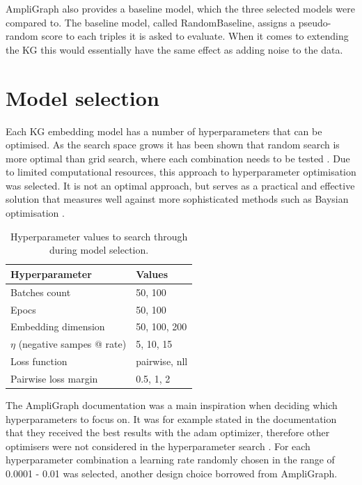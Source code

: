 AmpliGraph also provides a baseline model, which the three selected models were compared to. The baseline model, called RandomBaseline, assigns a pseudo-random score to each triples it is asked to evaluate. When it comes to extending the KG this would essentially have the same effect as adding noise to the data.

\section{Model selection}
Each KG embedding model has a number of hyperparameters that can be optimised. As the search space grows it has been shown that random search is more optimal than grid search, where each combination needs to be tested \cite{bergstra2012random}. Due to limited computational resources, this approach to hyperparameter optimisation was selected. It is not an optimal approach, but serves as a practical and effective solution that measures well against more sophisticated methods such as Baysian optimisation \cite{li2017hyperband}.

\begin{table}[htbp]
\centering
\begin{tabular}{|l|l|}
\hline
\textbf{Hyperparameter}      & \textbf{Values}             \\ \hline
Batches count       & 50, 100                              \\ \hline
Epocs               & 50, 100                          \\ \hline
Embedding dimension                   & 50, 100, 200                     \\ \hline
$\eta$ (negative sampes @ rate)     & 5, 10, 15                            \\ \hline
Loss function   & pairwise, nll                         \\ \hline
Pairwise loss margin    & 0.5, 1, 2                    \\ \hline
\end{tabular}
\caption[Hyperparameter values for model selection.]{Hyperparameter values to search through during model selection.}
\end{table}
The AmpliGraph documentation was a main inspiration when deciding which hyperparameters to focus on. It was for example stated in the documentation that they received the best results with the adam optimizer, therefore other optimisers were not considered in the hyperparameter search \cite{ampligraph_documentation}. For each hyperparameter combination a learning rate randomly chosen in the range of 0.0001 - 0.01 was selected, another design choice borrowed from AmpliGraph.

